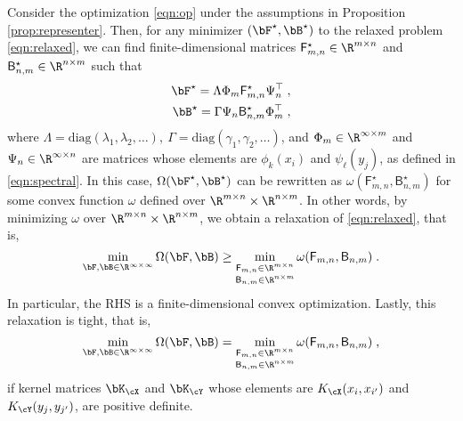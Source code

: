 \documentclass[11pt]{article}
\begin{document}
\begin{theorem}
	\label{thm:representer}
	Consider the optimization \eqref{eqn:op} under the assumptions in Proposition \ref{prop:representer}. Then, for any minimizer $(\bF^\star, \bB^\star)$ to the relaxed problem \eqref{eqn:relaxed}, we can find finite-dimensional matrices $\mathsf{F}_{m,n}^{\star} \in \R^{m \times n}$ and $\mathsf{B}_{n, m}^{\star} \in \R^{n \times m}$ such that
	\begin{align*}
		\bF^{\star}  = \Lambda \Phi_m \mathsf{F}_{m,n}^{\star} \Psi_n^\top \;, \\
		\bB^{\star}  = \Gamma \Psi_n \mathsf{B}_{n,m}^{\star} \Phi_m^\top \;,
	\end{align*}
	where $\Lambda = \text{diag}(\lambda_1, \lambda_2, \dots), ~\Gamma = \text{diag}(\gamma_1, \gamma_2, \dots)$, and $\Phi_{m} \in \R^{\infty \times m}$ and $\Psi_{n} \in \R^{\infty \times n}$ are matrices whose elements are $\phi_k(x_i)$ and $\psi_{\ell}(y_j)$, as defined in \eqref{eqn:spectral}. In this case, $\Omega(\bF^\star, \bB^\star)$ can be rewritten as $\omega(\mathsf{F}_{m, n}^{\star}, \mathsf{B}_{n, m}^{\star})$ for some convex function $\omega$ defined over $\R^{m \times n} \times \R^{n \times m}$. In other words, by minimizing $\omega$ over $\R^{m \times n} \times \R^{n \times m}$, we obtain a relaxation of \eqref{eqn:relaxed}, that is, 
	\begin{equation*}
		\min_{\bF, \bB \in \R^{\infty \times \infty}} \Omega(\bF, \bB)
		\ge
		\min_{\substack{\mathsf{F}_{m, n} \in \R^{m \times n} \\ \mathsf{B}_{n, m} \in \R^{n \times m}}} \omega(\mathsf{F}_{m, n}, \mathsf{B}_{n, m}) \;.
	\end{equation*}
	In particular, the RHS is a finite-dimensional convex optimization. Lastly, this relaxation is tight, that is,  
	\begin{equation*}
		\min_{\bF, \bB \in \R^{\infty \times \infty}} \Omega(\bF, \bB)
		=
		\min_{\substack{\mathsf{F}_{m, n} \in \R^{m \times n} \\ \mathsf{B}_{n, m} \in \R^{n \times m}}} \omega(\mathsf{F}_{m, n}, \mathsf{B}_{n, m}) \;,
	\end{equation*}
	if kernel matrices $\bK_{\cX}$ and $\bK_{\cY}$ whose elements are $K_{\cX}(x_i, x_{i'})$ and $K_{\cY}(y_j, y_{j'})$, are positive definite. 
\end{theorem}
\end{document}
